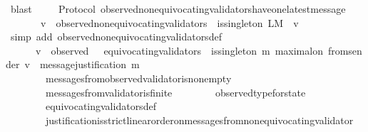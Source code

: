 \begin{isabellebody}
\ blast%
\endisatagproof
{\isafoldproof}%
%
\isadelimproof
\ \ \isanewline
%
\endisadelimproof
\isanewline
\isanewline
{}\isamarkupfalse%
\ {\isacharparenleft}\ Protocol{\isacharparenright}\ observed{\isacharunderscore}non{\isacharunderscore}equivocating{\isacharunderscore}validators{\isacharunderscore}have{\isacharunderscore}one{\isacharunderscore}latest{\isacharunderscore}message{\isacharcolon}\isanewline
\ \ {\isachardoublequoteopen}{\isasymforall}\ {\isasymsigma}\ {\isasymin}\ {\isasymSigma}{\isachardot}\ {\isacharparenleft}{\isasymforall}\ v\ {\isasymin}\ observed{\isacharunderscore}non{\isacharunderscore}equivocating{\isacharunderscore}validators\ {\isasymsigma}{\isachardot}\ is{\isacharunderscore}singleton\ {\isacharparenleft}L{\isacharunderscore}M\ {\isasymsigma}\ v{\isacharparenright}{\isacharparenright}{\isachardoublequoteclose}\ \ \isanewline
%
\isadelimproof
\ \ %
\endisadelimproof
%
\isatagproof
{}\isamarkupfalse%
\ {\isacharparenleft}simp\ add{\isacharcolon}\ observed{\isacharunderscore}non{\isacharunderscore}equivocating{\isacharunderscore}validators{\isacharunderscore}def{\isacharparenright}\isanewline
{}\isamarkupfalse%
\ {\isacharminus}\isanewline
\ \ \isamarkupfalse%
\ {\isachardoublequoteopen}{\isasymforall}\ {\isasymsigma}\ {\isasymin}\ {\isasymSigma}{\isachardot}\ {\isacharparenleft}{\isasymforall}\ v\ {\isasymin}\ observed\ {\isasymsigma}\ {\isacharminus}\ equivocating{\isacharunderscore}validators\ {\isasymsigma}{\isachardot}\ is{\isacharunderscore}singleton\ {\isacharbraceleft}m{\isachardot}\ maximal{\isacharunderscore}on\ {\isacharparenleft}from{\isacharunderscore}sender\ {\isacharparenleft}v{\isacharcomma}\ {\isasymsigma}{\isacharparenright}{\isacharparenright}\ message{\isacharunderscore}justification\ m{\isacharbraceright}{\isacharparenright}{\isachardoublequoteclose}\isanewline
\ \ \ \ \isamarkupfalse%
\ \isanewline
\ \ \ \ \ \ \ \ messages{\isacharunderscore}from{\isacharunderscore}observed{\isacharunderscore}validator{\isacharunderscore}is{\isacharunderscore}non{\isacharunderscore}empty\isanewline
\ \ \ \ \ \ \ \ messages{\isacharunderscore}from{\isacharunderscore}validator{\isacharunderscore}is{\isacharunderscore}finite\isanewline
\ \ \ \ \ \ \ \ observed{\isacharunderscore}type{\isacharunderscore}for{\isacharunderscore}state\isanewline
\ \ \ \ \ \ \ \ equivocating{\isacharunderscore}validators{\isacharunderscore}def\isanewline
\ \ \ \ \ \ \ \ justification{\isacharunderscore}is{\isacharunderscore}strict{\isacharunderscore}linear{\isacharunderscore}order{\isacharunderscore}on{\isacharunderscore}messages{\isacharunderscore}from{\isacharunderscore}non{\isacharunderscore}equivocating{\isacharunderscore}validator\isanewline

\end{isabellebody}
